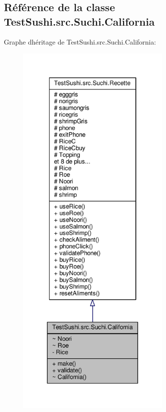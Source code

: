 \hypertarget{classTestSushi_1_1src_1_1Suchi_1_1California}{}\subsection{Référence de la classe Test\+Sushi.\+src.\+Suchi.\+California}
\label{classTestSushi_1_1src_1_1Suchi_1_1California}


Graphe d\textquotesingle{}héritage de Test\+Sushi.\+src.\+Suchi.\+California\+:\nopagebreak
\begin{figure}[H]
\begin{center}
\leavevmode
\includegraphics[height=550pt]{classTestSushi_1_1src_1_1Suchi_1_1California__inherit__graph}
\end{center}
\end{figure}


